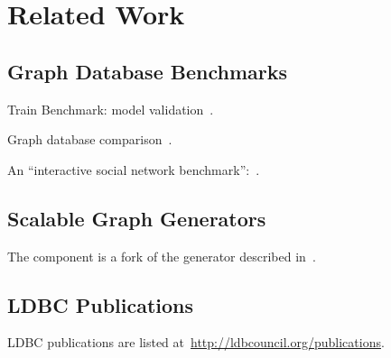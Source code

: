 \chapter{Related Work}
\label{section:related-work}


\section{Graph Database Benchmarks}

Train Benchmark: model validation~\cite{TrainBenchmarkSOSYM}.

Graph database comparison~\cite{lissandrini17}.

An ``interactive social network benchmark'':~\cite{DBLP:conf/cidr/BarahmandG13}.


\section{Scalable Graph Generators}

The \datagen component is a fork of the generator described in~\cite{DBLP:conf/tpctc/PhamBE12}.


\section{LDBC Publications}

LDBC publications are listed at~\url{http://ldbcouncil.org/publications}.